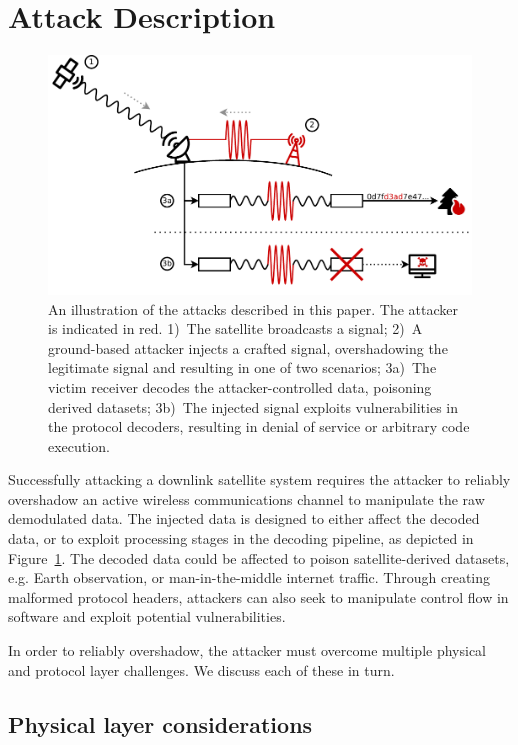 \section{Attack Description}\label{sec:attack}

\begin{figure}
  \centering
  \includegraphics[width=\columnwidth]{diagrams/attack_illustration.pdf}
  \caption{An illustration of the attacks described in this paper. The attacker is indicated in red. 1)~The satellite broadcasts a signal; 2)~A ground-based attacker injects a crafted signal, overshadowing the legitimate signal and resulting in one of two scenarios; 3a)~The victim receiver decodes the attacker-controlled data, poisoning derived datasets; 3b)~The injected signal exploits vulnerabilities in the protocol decoders, resulting in denial of service or arbitrary code execution.}
  \label{fig:attack-illustration}
\end{figure}

Successfully attacking a downlink satellite system requires the attacker to reliably overshadow an active wireless communications channel to manipulate the raw demodulated data.
The injected data is designed to either affect the decoded data, or to exploit processing stages in the decoding pipeline, as depicted in Figure~\ref{fig:attack-illustration}.
The decoded data could be affected to poison satellite-derived datasets, e.g. Earth observation, or man-in-the-middle internet traffic.
Through creating malformed protocol headers, attackers can also seek to manipulate control flow in software and exploit potential vulnerabilities.

In order to reliably overshadow, the attacker must overcome multiple physical and protocol layer challenges.
We discuss each of these in turn.

\subsection{Physical layer considerations}

